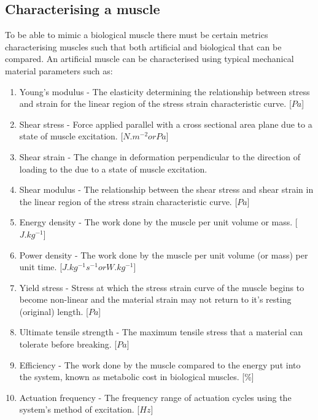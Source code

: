 \subsection{Characterising a muscle}
To be able to mimic a biological muscle there must be certain metrics characterising muscles such that both artificial and biological that can be compared. An artificial muscle can be characterised using typical mechanical material parameters such as:
\begin{enumerate}
    \item Young's modulus - The elasticity determining the relationship between stress and strain for the linear region of the stress strain characteristic curve. [$Pa$]
    \item Shear stress - Force applied parallel with a cross sectional area plane due to a state of muscle excitation. [$N.m^{-2} or Pa$]
    \item Shear strain - The change in deformation perpendicular to the direction of loading to the due to a state of muscle excitation.
    \item Shear modulus - The relationship between the shear stress and shear strain in the linear region of the stress strain characteristic curve. [$Pa$]
    \item Energy density - The work done by the muscle per unit volume or mass. [$J.kg^{-1}$]
    \item Power density - The work done by the muscle per unit volume (or mass) per unit time. [$J.kg^{-1}s^{-1} or W.kg^{-1}$]
    \item Yield stress - Stress at which the stress strain curve of the muscle begins to become non-linear and the material strain may not return to it's resting (original) length. [$Pa$] 
    \item Ultimate tensile strength - The maximum tensile stress that a material can tolerate before breaking. [$Pa$]
    \item Efficiency - The work done by the muscle compared to the energy put into the system, known as metabolic cost in biological muscles. [\%]
    \item Actuation frequency - The frequency range of actuation cycles using the system's method of excitation. [$Hz$]

\end{enumerate}
